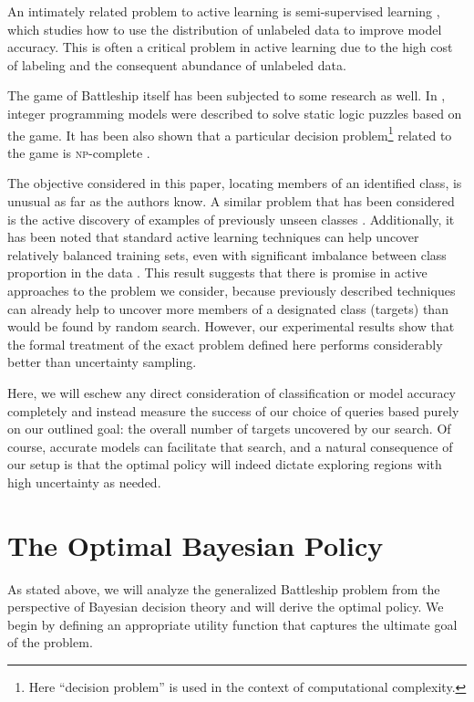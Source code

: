 \documentclass{article}
\begin{document}
An intimately related problem to active learning is semi-supervised
learning \citep{semisurvey}, which studies how to use the distribution
of unlabeled data to improve model accuracy.  This is often a critical
problem in active learning due to the high cost of labeling and the
consequent abundance of unlabeled data.

The game of Battleship itself has been subjected to some research as
well.  In \citep{solving}, integer programming models were described
to solve static logic puzzles based on the game.  It has been also
shown that a particular decision problem\footnote{Here ``decision
  problem'' is used in the context of computational complexity.}
related to the game is \textsc{np}-complete \citep{battleshipnp}.

The objective considered in this paper, locating members of an
identified class, is unusual as far as the authors know.  A similar
problem that has been considered is the active discovery of examples
of previously unseen classes \citep{rareclass}.  Additionally, it has
been noted that standard active learning techniques can help uncover
relatively balanced training sets, even with significant imbalance
between class proportion in the data \citep{activeimbalanced}.  This
result suggests that there is promise in active approaches to the
problem we consider, because previously described techniques can
already help to uncover more members of a designated class (targets)
than would be found by random search.  However, our experimental
results show that the formal treatment of the exact problem defined
here performs considerably better than uncertainty sampling.

Here, we will eschew any direct consideration of classification or
model accuracy completely and instead measure the success of our
choice of queries based purely on our outlined goal: the overall
number of targets uncovered by our search.  Of course, accurate models
can facilitate that search, and a natural consequence of our setup is
that the optimal policy will indeed dictate exploring regions with
high uncertainty as needed.

\section{The Optimal Bayesian Policy}
\label{optimal}

As stated above, we will analyze the generalized Battleship problem
from the perspective of Bayesian decision theory and will derive the
optimal policy.  We begin by defining an appropriate utility function
that captures the ultimate goal of the problem.
\end{document}
